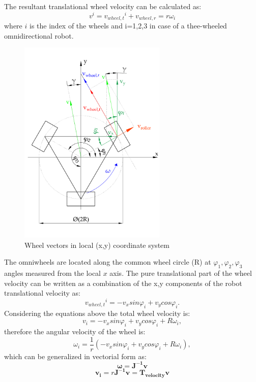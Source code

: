 \documentclass[12pt,english,twoside]{article}
\begin{document}
The resultant translational wheel velocity can be calculated as:
\begin{equation}
v^i = {v_{wheel,t}}^i + {v_{wheel,r}} = r \omega_i
\end{equation}
where $i$ is the index of the wheels and i=1,2,3 in case of a thee-wheeled omnidirectional robot.
\begin{figure}[htb!]
	\centering
	\includegraphics[width=7cm]{figures/omni_wheel_vectors}
	\caption{Wheel vectors in local (x,y) coordinate system}
	\label{omni_wheel_vectors}
\end{figure}

The omniwheels are located along the common wheel circle (R) at $\varphi_1, \varphi_2, \varphi_3$ angles measured from the local $x$ axis. The pure translational part of the wheel velocity can be written as a combination of the x,y components of the robot translational velocity as:
\begin{equation}
	{v_{wheel,t}}^i = - v_x sin \varphi_i  + v_y cos \varphi_i .
\end{equation}
Considering the equations above the total wheel velocity is:
\begin{equation}
	v_i = - v_x sin \varphi_i + v_y cos \varphi_i  + R \omega_i,
\end{equation}
therefore the angular velocity of the wheel is:
\begin{equation}
	\omega_i = \frac{1}{r} (- v_x sin \varphi_i + v_y cos \varphi_i + R \omega_i),
\end{equation}
which can be generalized in vectorial form as:
\begin{equation}
	\boldsymbol{\omega} = \mathbf{J^{-1}} \mathbf{v}
\end{equation}
\begin{equation}
\mathbf{v_i} = r \mathbf{J^{-1}} \mathbf{v} = \mathbf{T_{velocity}} \mathbf{v}
\label{velocity_tranformation}
\end{equation}
\end{document}
